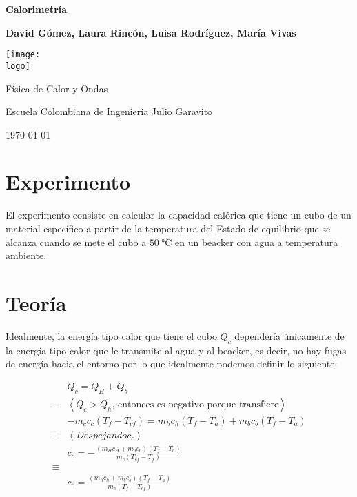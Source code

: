 \documentclass{article}
\newcommand{\logo}{"C:/Users/lalal/OneDrive/Documentos/Universidad/logo-eci.png"}
\newcommand{\titlename}{Calorimetría}%
\renewcommand{\author}{{David Gómez, Laura Rincón, Luisa Rodríguez, María Vivas}}
\begin{document}
\begin{titlepage}
    \begin{center}
        \vspace{1cm}

        \textbf{\Huge{\titlename}}

        \vspace{1.5cm}

        \textbf{\large{\author}}

        \vspace{3cm}

        \texttt{[image: \\logo]}
        
        \vfill

        Física de Calor y Ondas

        Escuela Colombiana de Ingeniería Julio Garavito 

        \today
    \end{center}
\end{titlepage}

\section{Experimento}

El experimento consiste en calcular la capacidad calórica que tiene
un cubo de un material específico a partir de la temperatura del Estado
de equilibrio que se alcanza cuando se mete el cubo a $\SI{50}{\degreeCelsius}$
en un beacker con agua a temperatura ambiente.

\section{Teoría}

Idealmente, la energía tipo calor que tiene el cubo
$Q_c$ dependería únicamente de la energía tipo calor que le transmite
al agua y al beacker, es decir, no hay fugas de energía hacia el entorno
por lo que idealmente podemos definir lo siguiente:

\begin{align*}
    & Q_c = Q_H + Q_b\\
    \equiv& \left<Q_c > Q_h \text{, entonces es negativo porque transfiere} \right> \\
    & - m_c c_c (T_f - T_{cf}) = m_h c_h(T_f - T_a) + m_b c_b (T_f-T_a)\\
    \equiv& \left< Despejando c_c \right>\\
    & c_c = -\frac{(m_Hc_H + m_bc_b)(T_f-T_a)}{m_c(T_{cf}-T_{f})}\\
    \equiv&\\
    & c_c = \frac{(m_hc_h + m_bc_b)(T_f-T_a)}{m_c(T_f-T_{cf})}
\end{align*}
\end{document}
